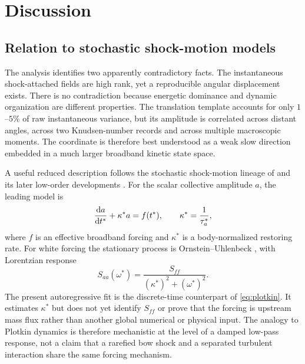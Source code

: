 \section{Discussion}
\subsection{Relation to stochastic shock-motion models}
The analysis identifies two apparently contradictory facts. The instantaneous shock-attached fields are high rank, yet a reproducible angular displacement exists. There is no contradiction because energetic dominance and dynamic organization are different properties. The translation template accounts for only $1$--$5\%$ of raw instantaneous variance, but its amplitude is correlated across distant angles, across two Knudsen-number records and across multiple macroscopic moments. The coordinate is therefore best understood as a weak slow direction embedded in a much larger broadband kinetic state space.

A useful reduced description follows the stochastic shock-motion lineage of \citet{Plotkin1975} and its later low-order developments \citep{PoggieSmits2005,Piponniau2009,TouberSandham2011,ClemensNarayanaswamy2014}. For the scalar collective amplitude $a$, the leading model is
\begin{equation}
 \frac{\mathrm d a}{\mathrm dt^*}+\kappa^*a=f(t^*),
 \qquad \kappa^*=\frac{1}{\tau_a^*},
 \label{eq:plotkin}
\end{equation}
where $f$ is an effective broadband forcing and $\kappa^*$ is a body-normalized restoring rate. For white forcing the stationary process is Ornstein--Uhlenbeck \citep{OrnsteinUhlenbeck1930}, with Lorentzian response
\begin{equation}
 S_{aa}(\omega^*)=\frac{S_{ff}}{(\kappa^*)^2+(\omega^*)^2}.
 \label{eq:lorentzian}
\end{equation}
The present autoregressive fit is the discrete-time counterpart of \cref{eq:plotkin}. It estimates $\kappa^*$ but does not yet identify $S_{ff}$ or prove that the forcing is upstream mass flux rather than another global numerical or physical input. The analogy to Plotkin dynamics is therefore mechanistic at the level of a damped low-pass response, not a claim that a rarefied bow shock and a separated turbulent interaction share the same forcing mechanism.

